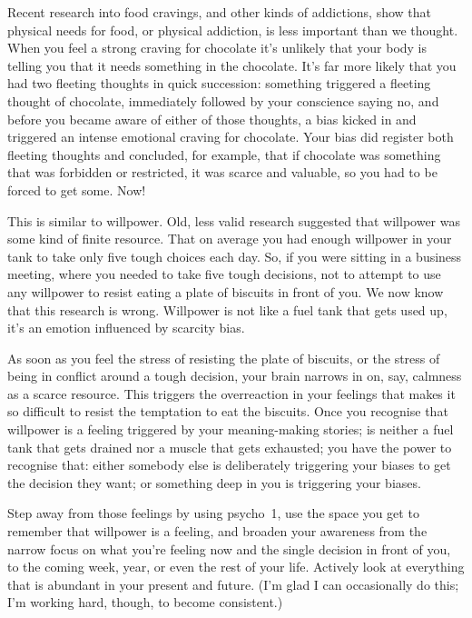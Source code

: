 Recent research into food cravings, and other kinds of addictions, show that physical needs for food, or physical addiction, is less important than we thought. When you feel a strong craving for chocolate it's unlikely that your body is telling you that it needs something in the chocolate. It's far more likely that you had two fleeting thoughts in quick succession: something triggered a fleeting thought of chocolate, immediately followed by your conscience saying no, and before you became aware of either of those thoughts, a bias kicked in and triggered an intense emotional craving for chocolate. Your bias did register both fleeting thoughts and concluded, for example, that if chocolate was something that was forbidden or restricted, it was scarce and valuable, so you had to be forced to get some. Now!


This is similar to willpower. Old, less valid research suggested that willpower was some kind of finite resource. That on average you had enough willpower in your tank to take only five tough choices each day. So, if you were sitting in a business meeting, where you needed to take five tough decisions, not to attempt to use any willpower to resist eating a plate of biscuits in front of you. We now know that this research is wrong. Willpower is not like a fuel tank that gets used up, it's an emotion influenced by scarcity bias.


As soon as you feel the stress of resisting the plate of biscuits, or the stress of being in conflict around a tough decision, your brain narrows in on, say, calmness as a scarce resource. This triggers the overreaction in your feelings that makes it so difficult to resist the temptation to eat the biscuits. Once you recognise that willpower is a feeling triggered by your meaning\hyp{}making stories; is neither a fuel tank that gets drained nor a muscle that gets exhausted; you have the power to recognise that: either somebody else is deliberately triggering your biases to get the decision they want; or something deep in you is triggering your biases. 


Step away from those feelings by using psycho~1, use the space you get to remember that willpower is a feeling, and broaden your awareness from the narrow focus on what you're feeling now and the single decision in front of you, to the coming week, year, or even the rest of your life. Actively look at everything that is abundant in your present and future. (I'm glad I can occasionally do this; I'm working hard, though, to become consistent.)
